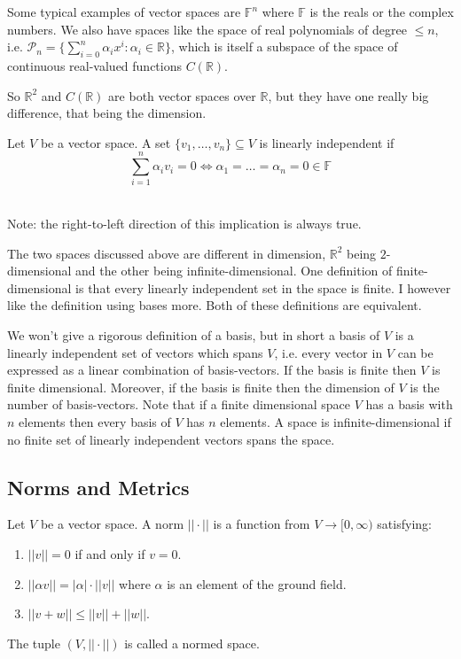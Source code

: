 \newpage 
Some typical examples of vector spaces are 
$\mathbb F^n$ where $\mathbb F$ is the reals or the complex 
numbers. We also have spaces like the space of real polynomials 
of degree $\leq n$, i.e. $\mathcal P_n = 
\{\sum_{i=0}^n \alpha_i x^i : \alpha_i \in \mathbb R\}$, 
which is itself a subspace of the space of continuous real-valued 
functions $C(\mathbb R)$. 

So $\mathbb R^2$ and $C(\mathbb R)$ 
are both vector spaces over $\mathbb R$, but 
they have one really big difference, that being the dimension. 

\begin{defn}
    \label{defn:linear_independence}
    Let $V$ be a vector space. A set $\{v_1,\ldots, v_n\} \subseteq V$
    is linearly independent if  
    $$ 
        \displaystyle\sum_{i=1}^n \alpha_i v_i = 0 
        \Leftrightarrow \alpha_1 = \dots = \alpha_n = 0 \in \mathbb F
    $$ 

    Note: the right-to-left direction of this implication is 
    always true. 
\end{defn}

The two spaces discussed above are different in dimension, 
$\mathbb R^2$ being $2$-dimensional and the other being 
infinite-dimensional. 
One definition of finite-dimensional is that every linearly 
independent set in the space is finite. 
I however like the definition using bases more. 
Both of these definitions are equivalent. 

We won't give a rigorous definition of a basis, but in short 
a basis of $V$ is a linearly independent set of vectors which spans 
$V$, i.e. every vector in $V$ can be expressed as a linear combination
of basis-vectors. If the basis is finite then $V$ 
is finite dimensional. Moreover, if the basis is finite then the 
dimension of $V$ is the number of basis-vectors. Note that 
if a finite dimensional space $V$ has a basis with $n$ elements 
then every basis of $V$ has $n$ elements. A space is  
infinite-dimensional if no finite set of linearly independent vectors 
spans the space. 

\newpage 
\subsection{Norms and Metrics}

\begin{defn}[Norm]
    \label{defn:norm}
    Let $V$ be a vector space. 
    A norm $|| \cdot || $ is a function 
    from $V \to [0,\infty)$ satisfying: 
    \begin{enumerate}
        \item $|| v || = 0$ if and only if 
            $v = 0$. 
        \item $|| \alpha v || = |\alpha| \cdot ||v||$ where 
            $\alpha$ is an element of the ground field. 
        \item $||v + w|| \leq ||v|| + ||w||$.
    \end{enumerate}
    
    The tuple $(V, ||\cdot||)$ is called a normed space. 
\end{defn}

